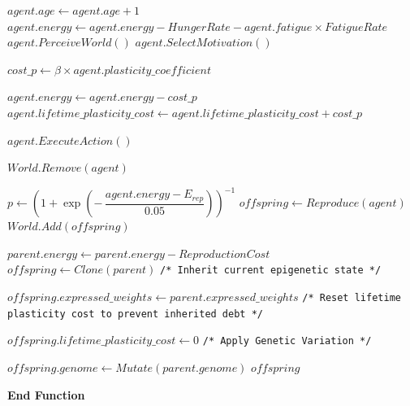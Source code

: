 \documentclass[a4paper,11pt]{article}
\newcommand{\algcmt}[1]{%
  \Statex \hspace*{1em}\texttt{/* #1 */}%
}
\begin{document}
\begin{algorithm}[H]
\caption{Asynchronous Evolutionary with Plasticity Cost}
\begin{algorithmic}[1]


    \State $agent.age \gets agent.age + 1$
    \State $agent.energy \gets agent.energy - HungerRate - agent.fatigue \times FatigueRate$ %
    \State $agent.PerceiveWorld()$
    \State $agent.SelectMotivation()$

    \State $cost\_p \gets \beta \times agent.plasticity\_coefficient$

        \State $agent.energy \gets agent.energy - cost\_p$
        \State $agent.lifetime\_plasticity\_cost \gets agent.lifetime\_plasticity\_cost + cost\_p$
    \EndIf

    \Statex
    \State $agent.ExecuteAction()$

    \Statex
        \State $World.Remove(agent)$
        \State \Return
    \EndIf

    \Statex
    \State $p \gets \left(1 + \exp\!\left(-\,\dfrac{agent.energy - E_{rep}}{0.05}\right)\right)^{-1}$ %
        \State $offspring \gets Reproduce(agent)$
        \State $World.Add(offspring)$
    \EndIf

\EndFunction

\Statex


    \State $parent.energy \gets parent.energy - ReproductionCost$
    \State $offspring \gets Clone(parent)$
    \algcmt{Inherit current epigenetic state}
    \State $offspring.expressed\_weights \gets parent.expressed\_weights$
    \algcmt{Reset lifetime plasticity cost to prevent inherited debt}
    \State $offspring.lifetime\_plasticity\_cost \gets 0$
    \algcmt{Apply Genetic Variation}
    \State $offspring.genome \gets Mutate(parent.genome)$
    \State \Return $offspring$

\Statex \textbf{End Function}

\end{algorithmic}
\end{algorithm}
\end{document}
